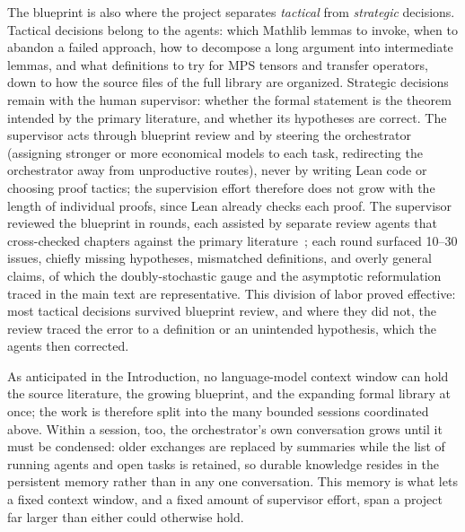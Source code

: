 The blueprint is also where the project separates \textit{tactical} from \textit{strategic} decisions. Tactical decisions belong to the agents: which Mathlib lemmas to invoke, when to abandon a failed approach, how to decompose a long argument into intermediate lemmas, and what definitions to try for MPS tensors and transfer operators, down to how the \nFilesfull{} source files of the full library are organized. Strategic decisions remain with the human supervisor: whether the formal statement is the theorem intended by the primary literature, and whether its hypotheses are correct. The supervisor acts through blueprint review and by steering the orchestrator (assigning stronger or more economical models to each task, redirecting the orchestrator away from unproductive routes), never by writing Lean code or choosing proof tactics; the supervision effort therefore does not grow with the length of individual proofs, since Lean already checks each proof. The supervisor reviewed the blueprint in \nReviewRounds{} rounds, each assisted by separate review agents that cross-checked chapters against the primary literature~\cite{Perez-Garcia2007Matrix,Cirac2017Matrixa,Cirac2021Matrix,Sanz2010Quantum}; each round surfaced 10--30 issues, chiefly missing hypotheses, mismatched definitions, and overly general claims, of which the doubly-stochastic gauge and the asymptotic reformulation traced in the main text are representative. This division of labor proved effective: most tactical decisions survived blueprint review, and where they did not, the review traced the error to a definition or an unintended hypothesis, which the agents then corrected.

As anticipated in the Introduction, no language-model context window can hold the source literature, the growing blueprint, and the expanding formal library at once; the work is therefore split into the many bounded sessions coordinated above. Within a session, too, the orchestrator's own conversation grows until it must be condensed: older exchanges are replaced by summaries while the list of running agents and open tasks is retained, so durable knowledge resides in the persistent memory rather than in any one conversation. This memory is what lets a fixed context window, and a fixed amount of supervisor effort, span a project far larger than either could otherwise hold.
